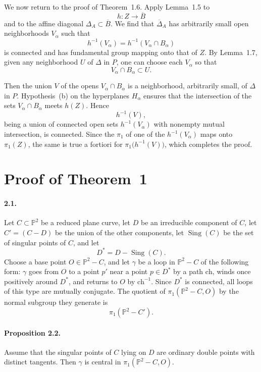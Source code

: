 \documentclass[11pt]{amsart}
\newcommand{\PP}{\mathbb{P}}
\newcommand{\DeltaDiag}{\Delta}
\begin{document}
We now return to the proof of Theorem~1.6. Apply Lemma~1.5 to
\[
h\colon Z\to \overline B
\]
and to the affine diagonal $\Delta_A\subset \overline B$. We find that $\overline\Delta_A$ has arbitrarily small open neighborhoods $V_\alpha$ such that
\[
h^{-1}(V_\alpha)=h^{-1}(V_\alpha\cap B_\alpha)
\]
is connected and has fundamental group mapping onto that of $Z$. By Lemma~1.7, given any neighborhood $U$ of $\DeltaDiag$ in $P$, one can choose each $V_\alpha$ so that
\[
V_\alpha\cap B_\alpha\subset U.
\]

Then the union $V$ of the opens $V_\alpha\cap B_\alpha$ is a neighborhood, arbitrarily small, of $\DeltaDiag$ in $P$. Hypothesis~(b) on the hyperplanes $H_\alpha$ ensures that the intersection of the sets $V_\alpha\cap B_\alpha$ meets $h(Z)$. Hence
\[
h^{-1}(V),
\]
being a union of connected open sets $h^{-1}(V_\alpha)$ with nonempty mutual intersection, is connected. Since the $\pi_1$ of one of the $h^{-1}(V_\alpha)$ maps onto $\pi_1(Z)$, the same is true a fortiori for $\pi_1\bigl(h^{-1}(V)\bigr)$, which completes the proof.

\section{Proof of Theorem~1}

\paragraph{\textbf{2.1.}}
Let $C\subset \PP^2$ be a reduced plane curve, let $D$ be an irreducible component of $C$, let $C'=(C-D)$ be the union of the other components, let $\operatorname{Sing}(C)$ be the set of singular points of $C$, and let
\[
D^*=D-\operatorname{Sing}(C).
\]
Choose a base point $O\in \PP^2-C$, and let $\gamma$ be a loop in $\PP^2-C$ of the following form: $\gamma$ goes from $O$ to a point $p'$ near a point $p\in D^*$ by a path $\mathrm{ch}$, winds once positively around $D^*$, and returns to $O$ by $\mathrm{ch}^{-1}$. Since $D^*$ is connected, all loops of this type are mutually conjugate. The quotient of $\pi_1(\PP^2-C,O)$ by the normal subgroup they generate is
\[
\pi_1(\PP^2-C').
\]

\paragraph{\textbf{Proposition 2.2.}}
Assume that the singular points of $C$ lying on $D$ are ordinary double points with distinct tangents. Then $\gamma$ is central in $\pi_1(\PP^2-C,O)$.
\end{document}
